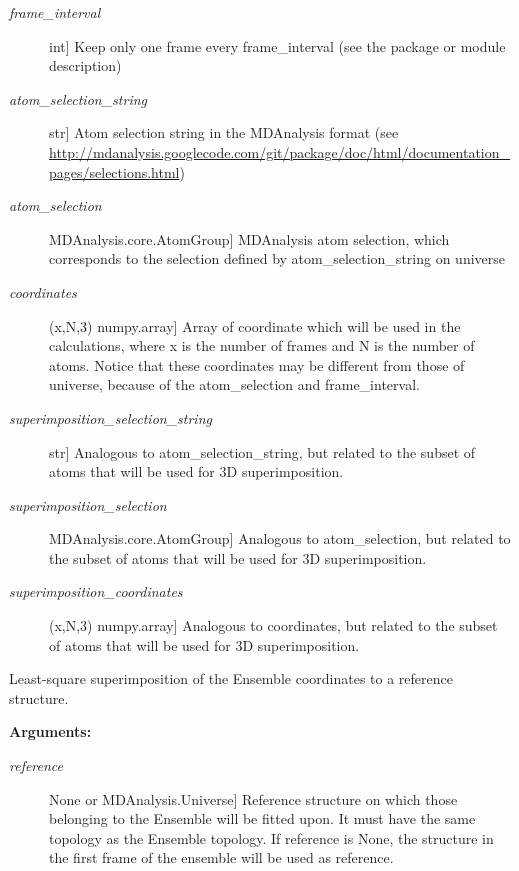 \documentclass[letterpaper,10pt,english]{sphinxmanual}
\begin{document}
\begin{fulllineitems}
\begin{description}
\item[{\emph{frame\_interval}}] \leavevmode{[}int{]}
Keep only one frame every frame\_interval (see the package or module description)

\item[{\emph{atom\_selection\_string}}] \leavevmode{[}str{]}
Atom selection string in the MDAnalysis format (see \href{http://mdanalysis.googlecode.com/git/package/doc/html/documentation\_pages/selections.html}{http://mdanalysis.googlecode.com/git/package/doc/html/documentation\_pages/selections.html})

\item[{\emph{atom\_selection}}] \leavevmode{[}MDAnalysis.core.AtomGroup{]}
MDAnalysis atom selection, which corresponds to the selection defined by atom\_selection\_string on universe

\item[{\emph{coordinates}}] \leavevmode{[}(x,N,3) numpy.array{]}
Array of coordinate which will be used in the calculations, where x is the number of frames and N is the number of atoms. Notice that these coordinates may be different from those of universe, because of the atom\_selection and frame\_interval.

\item[{\emph{superimposition\_selection\_string}}] \leavevmode{[}str{]}
Analogous to atom\_selection\_string, but related to the subset of atoms that will be used for 3D superimposition.

\item[{\emph{superimposition\_selection}}] \leavevmode{[}MDAnalysis.core.AtomGroup{]}
Analogous to atom\_selection, but related to the subset of atoms that will be used for 3D superimposition.

\item[{\emph{superimposition\_coordinates}}] \leavevmode{[}(x,N,3) numpy.array{]}
Analogous to coordinates, but related to the subset of atoms that will be used for 3D superimposition.

\end{description}

\begin{fulllineitems}
\label{index:encore.Ensemble.Ensemble.align}
Least-square superimposition of the Ensemble coordinates to a reference structure.

\textbf{Arguments:}
\begin{description}
\item[{\emph{reference}}] \leavevmode{[}None or MDAnalysis.Universe{]}
Reference structure on which those belonging to the Ensemble will be fitted upon.
It must have the same topology as the Ensemble topology.
If reference is None, the structure in the first frame of the ensemble will be used as reference.


\end{description}
\end{fulllineitems}
\end{fulllineitems}
\end{document}
